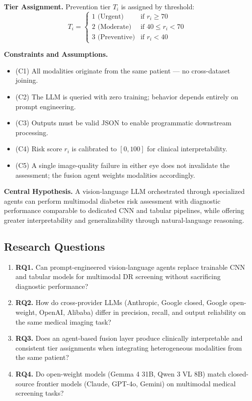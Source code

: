 \documentclass[11pt,a4paper]{article}
\begin{document}
\textbf{Tier Assignment.} Prevention tier $T_i$ is assigned by threshold:
\begin{equation}
T_i = \begin{cases}
1 \text{ (Urgent)} & \text{if } r_i \geq 70 \\
2 \text{ (Moderate)} & \text{if } 40 \leq r_i < 70 \\
3 \text{ (Preventive)} & \text{if } r_i < 40
\end{cases}
\end{equation}

\textbf{Constraints and Assumptions.}
\begin{itemize}
    \item (C1) All modalities originate from the same patient --- no cross-dataset joining.
    \item (C2) The LLM is queried with zero training; behavior depends entirely on prompt engineering.
    \item (C3) Outputs must be valid JSON to enable programmatic downstream processing.
    \item (C4) Risk score $r_i$ is calibrated to $[0, 100]$ for clinical interpretability.
    \item (C5) A single image-quality failure in either eye does not invalidate the assessment; the fusion agent weights modalities accordingly.
\end{itemize}

\textbf{Central Hypothesis.} A vision-language LLM orchestrated through specialized agents can perform multimodal diabetes risk assessment with diagnostic performance comparable to dedicated CNN and tabular pipelines, while offering greater interpretability and generalizability through natural-language reasoning.

\subsection{Research Questions}

\begin{enumerate}
    \item \textbf{RQ1.} Can prompt-engineered vision-language agents replace trainable CNN and tabular models for multimodal DR screening without sacrificing diagnostic performance?
    \item \textbf{RQ2.} How do cross-provider LLMs (Anthropic, Google closed, Google open-weight, OpenAI, Alibaba) differ in precision, recall, and output reliability on the same medical imaging task?
    \item \textbf{RQ3.} Does an agent-based fusion layer produce clinically interpretable and consistent tier assignments when integrating heterogeneous modalities from the same patient?
    \item \textbf{RQ4.} Do open-weight models (Gemma 4 31B, Qwen 3 VL 8B) match closed-source frontier models (Claude, GPT-4o, Gemini) on multimodal medical screening tasks?
\end{enumerate}
\end{document}
